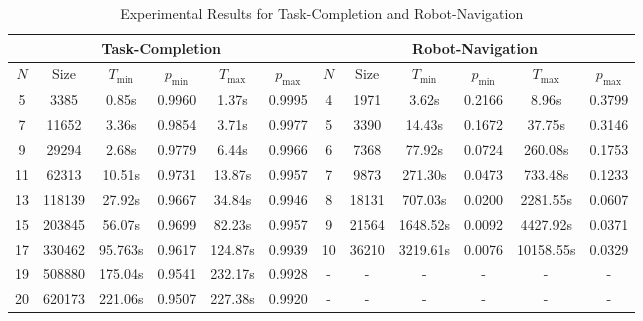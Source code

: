 \begin{table}
\vspace{-1em}
\caption{Experimental Results for Task-Completion and Robot-Navigation}
\label{tab:expmresults}
\centering
\begin{tabular}{|c|c|c|c|c|c||||c|c|c|c|c|c|}
\hline
\multicolumn{6}{|c||||}{Task-Completion} & \multicolumn{6}{|c|}{Robot-Navigation}\\
\hline
$N$ & Size & $T_{\min}$ & $p_{\min}$ & $T_{\max}$ & $p_{\max}$ & $N$ & Size & $T_{\min}$ & $p_{\min}$ & $T_{\max}$  & $p_{\max}$ \\
\hline
5& 3385 & 0.85s & 0.9960 & 1.37s & 0.9995 & 4& 1971 & 3.62s & 0.2166 & 8.96s & 0.3799  \\
\hline
7& 11652 & 3.36s & 0.9854 & 3.71s & 0.9977 & 5& 3390 & 14.43s & 0.1672 & 37.75s & 0.3146 \\
\hline
9& 29294 & 2.68s & 0.9779 & 6.44s & 0.9966 & 6& 7368 & 77.92s & 0.0724 & 260.08s & 0.1753 \\
\hline
11& 62313 & 10.51s & 0.9731 & 13.87s & 0.9957 & 7& 9873 & 271.30s & 0.0473 & 733.48s & 0.1233 \\
\hline
13& 118139 & 27.92s & 0.9667 & 34.84s & 0.9946 & 8& 18131 & 707.03s & 0.0200 & 2281.55s & 0.0607 \\
\hline
15& 203845 & 56.07s & 0.9699 & 82.23s & 0.9957 & 9& 21564 & 1648.52s & 0.0092 & 4427.92s & 0.0371 \\
\hline
17& 330462 & 95.763s & 0.9617 & 124.87s & 0.9939 & 10& 36210 & 3219.61s & 0.0076 & 10158.55s & 0.0329 \\
\hline
19& 508880 & 175.04s & 0.9541 & 232.17s & 0.9928 & - & - & - & - & - & -\\
\hline
20& 620173 & 221.06s & 0.9507 & 227.38s & 0.9920 & - & - & - & - & - & - \\
\hline
\end{tabular}
\vspace{-1em}
\end{table}






